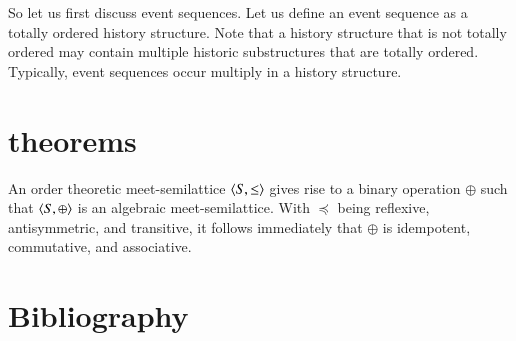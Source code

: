 \documentclass{elsarticle}
\begin{document}
	So let us first discuss event sequences.
	Let us define an event sequence as a totally ordered history structure.
	Note that a history structure that is not totally ordered may contain multiple historic substructures
	that are totally ordered.
	Typically, event sequences occur multiply in a history structure.

\section{theorems}
\label{sct:theorems}
	An order theoretic meet-semilattice $\langle S, \leq\rangle$ gives rise to a binary operation $\oplus$ such that $\langle S, \oplus\rangle$ is an algebraic meet-semilattice.
	With $\preceq$ being reflexive, antisymmetric, and transitive,
	it follows immediately that $\oplus$ is idempotent, commutative, and associative.
\section{Bibliography}


\end{document}
